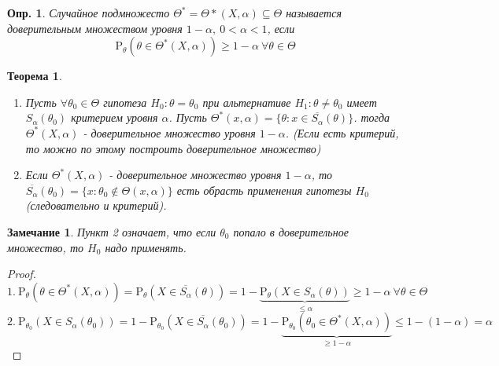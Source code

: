 \documentclass[12pt]{article}
\newtheorem{definition}{Опр.}
\newtheorem{remark}{Замечание}
\theoremstyle{basic_theorem}
\newtheorem{theorem}{Теорема}
\theoremstyle{name_theorem}
\def\P{ \mathrm{P} }
\begin{document}
\begin{definition}
    Случайное подмножесто \(\Theta^*=\Theta*(X,\alpha)\subseteq\Theta\)
    называется доверительным множеством уровня \(1-\alpha,\ 0<\alpha<1\),
    если
    \[\P_\theta(\theta\in\Theta^*(X,\alpha))\geq 1-\alpha\ \forall\theta\in\Theta\]
\end{definition}
\begin{theorem} \label{th::trusted_set_eq_plausibility_test}
    \begin{enumerate}
        \item Пусть \(\forall\theta_0\in\Theta\) гипотеза \(H_0:\theta=\theta_0\)
        при альтернативе \(H_1:\theta\neq\theta_0\) имеет \(S_\alpha(\theta_0)\)
        критерием уровня \(\alpha\). Пусть \(\Theta^*(x,\alpha) = \{\theta:x\in\overline{S_\alpha}(\theta)\}\).
        тогда \(\Theta^*(X,\alpha)\) - доверительное множество уровня \(1-\alpha\).
        (Если есть критерий, то можно по этому  построить доверительное множество)

        \item Если \(\Theta^*(X,\alpha)\) - доверительное множество уровня \(1-\alpha\),
        то \(\overline{S_\alpha}(\theta_0)=\{x:\theta_0\notin\Theta(x,\alpha)\}\)
        есть обрасть применения гипотезы \(H_0\) (следовательно и критерий).
    \end{enumerate}
\end{theorem}
\begin{remark} \label{hyp::accept_HO}
    Пункт 2 означает, что если \(\theta_0\) попало в доверительное множество,
    то \(H_0\) надо применять.
\end{remark}
\begin{proof}
    \[1.\ \P_\theta(\theta\in\Theta^*(X,\alpha)) = \P_\theta(X\in\overline{S_\alpha}(\theta)) = 1 - \underbrace{\P_\theta(X\in S_\alpha(\theta))}_{\leq\alpha}\geq 1-\alpha\ \forall\theta\in\Theta\]
    \[2.\ \P_{\theta_0}(X\in S_\alpha(\theta_0)) = 1-\P_{\theta_0}(X\in \overline{S_\alpha}(\theta_0))=
        1-\underbrace{\P_{\theta_0}(\theta_0\in\Theta^*(X,\alpha))}_{\geq 1-\alpha} \leq 1-(1-\alpha) = \alpha\]
\end{proof}
\end{document}
